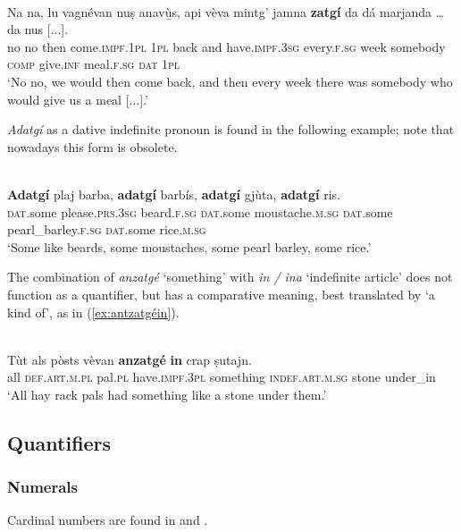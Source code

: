 \ea

\\
 \gll Na na, lu vagnévan nuṣ anavù̱s, api vèva mintg’ jamna \textbf{zatgí} da dá marjanda … da nus [...].\\
 no no then come.\textsc{impf.1pl} \textsc{1pl} back and have.\textsc{impf.3sg} every.\textsc{f.sg}  week somebody \textsc{comp} give.\textsc{inf} meal.\textsc{f.sg} {} \textsc{dat} \textsc{1pl}\\
 \glt `No no, we would then come back, and then every week there was somebody who would give us a meal [...].'
 \z 
 
\textit{Adatgí} as a dative indefinite pronoun is found in the following example; note that nowadays this form is obsolete.

\ea
{}\\
\gll  \textbf{Adatgí} plaj barba, \textbf{adatgí} barbís, \textbf{adatgí} gjùta, \textbf{adatgí} ris. \\
\textsc{dat}.some please.\textsc{prs.3sg} beard.\textsc{f.sg}  \textsc{dat}.some moustache.\textsc{m.sg} \textsc{dat}.some pearl\_barley.\textsc{f.sg} \textsc{dat}.some rice.\textsc{m.sg} \\
\glt `Some like beards, some moustaches, some pearl barley, some rice.'
\z

The combination of \textit{anzatgé} `something' with \textit{in / ina} `indefinite article' does not function as a quantifier, but has a comparative meaning, best translated by `a kind of', as in (\ref{ex:antzatgéin}).

\ea\label{ex:antzatgéin}
\\
\gll   Tùt als pòsts vèvan \textbf{anzatgé} \textbf{in} crap ṣutajn.\\
all \textsc{def.art.m.pl} pal.\textsc{pl} have.\textsc{impf.3pl} something \textsc{indef.art.m.sg} stone under\_in\\
\glt `All hay rack pals had something like a stone under them.'
\z

\subsection{Quantifiers}

\subsubsection{Numerals}
Cardinal numbers are found in  and .


